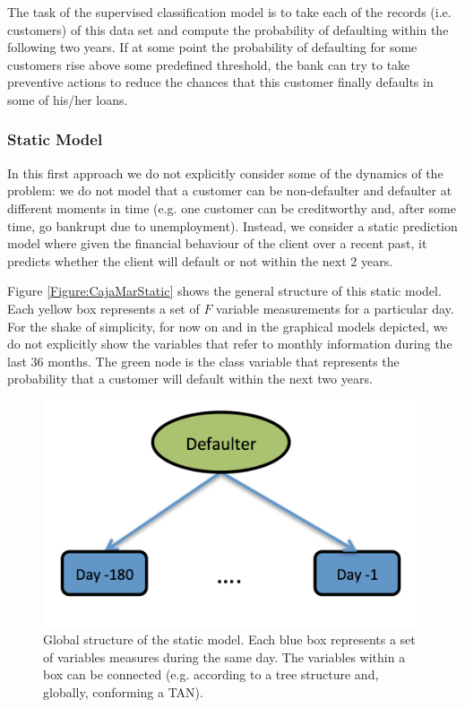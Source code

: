 \begin{itemize}
The task of the supervised classification model is to take each of the records (i.e. customers) of this data set and compute the probability of defaulting within the following two years. If at some point the probability of defaulting for some customers rise above some predefined threshold, the bank can try to take preventive actions to reduce the chances that this customer finally defaults in some of his/her loans.

\end{itemize}
 

\subsubsection*{Static Model} 

In this first approach we do not explicitly consider some of the dynamics of the problem: we do not model that a customer can be non-defaulter and defaulter at different moments in time (e.g. one customer can be creditworthy and, after some time, go bankrupt due to unemployment). Instead, we consider a static prediction model where given the financial behaviour of the client over a recent past, it predicts whether the client will default or not within the next 2 years. 

Figure \ref{Figure:CajaMarStatic} shows the general structure of this static model. Each yellow box represents a set of $F$ variable measurements for a particular day.
For the shake of simplicity, for now on and in the graphical models depicted, we do not explicitly show the variables that refer to monthly information during the last 36 months. The green node is the class variable that represents the probability that a customer will default within the next two years. 

\begin{figure}
\begin{center}
\includegraphics[scale=0.45]{./figures/CajaMarModel0}
\caption{\label{Figure:CajaMarStatic}Global structure of the static model. Each blue box represents a set of variables measures during the same day.
The variables within a box can be connected (e.g. according to a tree structure and, globally, conforming a TAN).}
\label{fig:static}
\end{center}
\end{figure}

